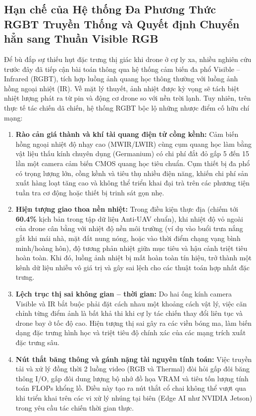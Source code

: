 \documentclass[11pt,a4paper]{article}
\begin{document}
\subsection{Hạn chế của Hệ thống Đa Phương Thức RGBT Truyền Thống và Quyết định Chuyển hẳn sang Thuần Visible RGB}
Để bù đắp sự thiếu hụt đặc trưng thị giác khi drone ở cự ly xa, nhiều nghiên cứu trước đây đã tiếp cận bài toán thông qua hệ thống cảm biến đa phổ Visible -- Infrared (RGBT), tích hợp luồng ảnh quang học thông thường với luồng ảnh hồng ngoại nhiệt (IR). Về mặt lý thuyết, ảnh nhiệt được kỳ vọng sẽ tách biệt nhiệt lượng phát ra từ pin và động cơ drone so với nền trời lạnh. Tuy nhiên, trên thực tế tác chiến dã chiến, hệ thống RGBT bộc lộ những nhược điểm cố hữu chí mạng:
\begin{enumerate}
    \item \textbf{Rào cản giá thành và khí tài quang điện tử cồng kềnh:} Cảm biến hồng ngoại nhiệt độ nhạy cao (MWIR/LWIR) cùng cụm quang học làm bằng vật liệu thấu kính chuyên dụng (Germanium) có chi phí đắt đỏ gấp 5 đến 15 lần một camera cảm biến CMOS quang học tiêu chuẩn. Cụm thiết bị đa phổ có trọng lượng lớn, cồng kềnh và tiêu thụ nhiều điện năng, khiến chi phí sản xuất hàng loạt tăng cao và không thể triển khai đại trà trên các phương tiện tuần tra cơ động hoặc thiết bị trinh sát gọn nhẹ.
    \item \textbf{Hiện tượng giao thoa nền nhiệt: } Trong điều kiện thực địa (chiếm tới \textbf{60.4\%} kịch bản trong tập dữ liệu Anti-UAV chuẩn), khi nhiệt độ vỏ ngoài của drone cân bằng với nhiệt độ nền môi trường (ví dụ vào buổi trưa nắng gắt khi mái nhà, mặt đất nung nóng, hoặc vào thời điểm chạng vạng bình minh/hoàng hôn), độ tương phản nhiệt giữa mục tiêu và hậu cảnh triệt tiêu hoàn toàn. Khi đó, luồng ảnh nhiệt bị mất hoàn toàn tín hiệu, trở thành một kênh dữ liệu nhiễu vô giá trị và gây sai lệch cho các thuật toán hợp nhất đặc trưng.
    \item \textbf{Lệch trục thị sai không gian -- thời gian:} Do hai ống kính camera Visible và IR bắt buộc phải đặt cách nhau một khoảng cách vật lý, việc căn chỉnh từng điểm ảnh là bất khả thi khi cự ly tác chiến thay đổi liên tục và drone bay ở tốc độ cao. Hiện tượng thị sai gây ra các viền bóng ma, làm biến dạng đặc trưng hình học và triệt tiêu độ chính xác của các mạng trích xuất đặc trưng sâu.
    \item \textbf{Nút thắt băng thông và gánh nặng tài nguyên tính toán:} Việc truyền tải và xử lý đồng thời 2 luồng video (RGB và Thermal) đòi hỏi gấp đôi băng thông I/O, gấp đôi dung lượng bộ nhớ đồ họa VRAM và tiêu tốn lượng tính toán FLOPs khổng lồ. Điều này tạo ra nút thắt cổ chai không thể vượt qua khi triển khai trên các vi xử lý nhúng tại biên (Edge AI như NVIDIA Jetson) trong yêu cầu tác chiến thời gian thực.
\end{enumerate}
\end{document}
